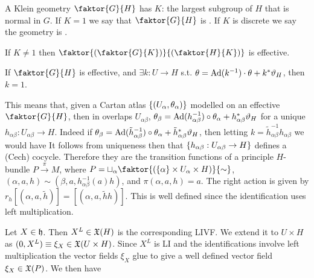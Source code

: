 \documentclass{article}
\begin{document}
\begin{definition}
	A Klein geometry $\faktor{G}{H}$ has  $K$: the largest subgroup of $H$ that is normal in $G$. If $K=1$ we say that $\faktor{G}{H}$ is . If $K$ is discrete we say the geometry is .
\end{definition}

\begin{lemma}
	If $K \neq 1$ then $\faktor{{(\faktor{G}{K})}}{{(\faktor{H}{K})}}$ is effective. 
\end{lemma}

\begin{prop}
	If $\faktor{G}{H}$ is effective, and $\exists k:U \to H$ s.t. $\theta = \operatorname{Ad}(k^{-1})\cdot \theta + k^\ast \vartheta_H$, then $k=1$. 
\end{prop}

This means that, given a Cartan atlas $\left\{ (U_\alpha,\theta_\alpha) \right\}$ modelled on an effective $\faktor{G}{H}$, then in overlaps $U_{\alpha\beta}$, $\theta_\beta = \operatorname{Ad}(h_{\alpha\beta}^{-1}) \circ \theta_\alpha + h_{\alpha\beta}^\ast \vartheta_H$ for a unique $h_{\alpha\beta}:U_{\alpha\beta} \to H$. Indeed if $\theta_\beta = \operatorname{Ad}(\tilde{h}_{\alpha\beta}^{-1}) \circ \theta_\alpha + \tilde{h}_{\alpha\beta}^\ast \vartheta_H$, then letting $k = \tilde{h}_{\alpha\beta}^{-1} h_{\alpha\beta}$ we would have
It follows from uniqueness then that $\left\{ h_{\alpha\beta} : U_{\alpha\beta} \to H \right\}$ defines a (Cech) cocycle. Therefore they are the transition functions of a principle $H$-bundle $P\overset{\pi}{\to} M$, where $P = \sqcup_{\alpha} \faktor{(\pbrace{\alpha}\times U_\alpha \times H)}{\sim}$, $(\alpha,a,h)\sim (\beta,a,h_{\alpha\beta}^{-1}(a)h)$, and $\pi(\alpha,a,h) = a$. The right action is given by $r_h[(\alpha,a,\tilde{h})] = [(\alpha,a,\tilde{h}h)]$. This is well defined since the identification uses left multiplication. 

Let $X \in \mathfrak{h}$. Then $X^L\in\mathfrak{X}(H)$ is the corresponding LIVF. We extend it to $U \times H$ as $(0,X^L) \equiv \xi_X \in\mathfrak{X}(U \times H)$. Since $X^L$ is LI and the identifications involve left multiplication the vector fields $\xi_X$ glue to give a well defined vector field $\xi_X \in \mathfrak{X}(P)$. We then have 
\end{document}
